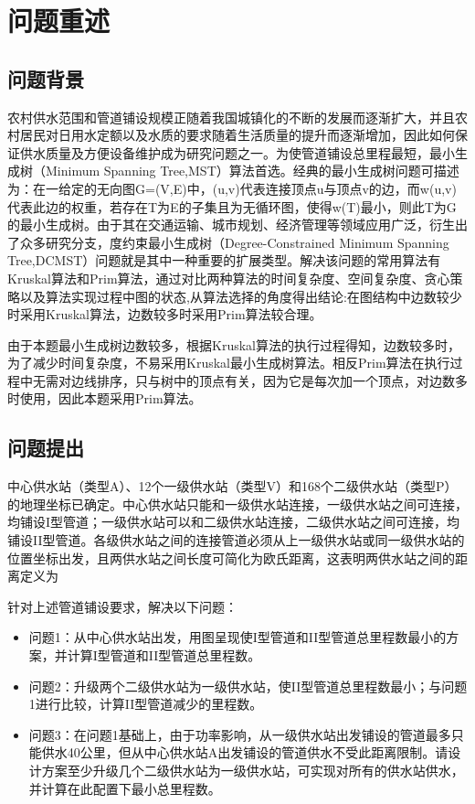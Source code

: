 \documentclass{cumcmthesis}
\begin{document}
\tableofcontents

\newpage
\section{问题重述}
\subsection{问题背景}
农村供水范围和管道铺设规模正随着我国城镇化的不断的发展而逐渐扩大，并且农村居民对日用水定额以及水质的要求随着生活质量的提升而逐渐增加，因此如何保证供水质量及方便设备维护成为研究问题之一。为使管道铺设总里程最短，最小生成树（Minimum Spanning Tree,MST）算法首选。经典的最小生成树问题可描述为：在一给定的无向图G=(V,E)中，(u,v)代表连接顶点u与顶点v的边，而w(u,v)代表此边的权重，若存在T为E的子集且为无循环图，使得w(T)最小，则此T为G的最小生成树。由于其在交通运输、城市规划、经济管理等领域应用广泛，衍生出了众多研究分支，度约束最小生成树（Degree-Constrained Minimum Spanning Tree,DCMST）问题就是其中一种重要的扩展类型。解决该问题的常用算法有Kruskal算法和Prim算法，通过对比两种算法的时间复杂度、空间复杂度、贪心策略以及算法实现过程中图的状态,从算法选择的角度得出结论:在图结构中边数较少时采用Kruskal算法，边数较多时采用Prim算法较合理。

由于本题最小生成树边数较多，根据Kruskal算法的执行过程得知，边数较多时，为了减少时间复杂度，不易采用Kruskal最小生成树算法。相反Prim算法在执行过程中无需对边线排序，只与树中的顶点有关，因为它是每次加一个顶点，对边数多时使用，因此本题采用Prim算法。


\subsection{问题提出}
中心供水站（类型A）、12个一级供水站（类型V）和168个二级供水站（类型P）的地理坐标已确定。中心供水站只能和一级供水站连接，一级供水站之间可连接，均铺设I型管道；一级供水站可以和二级供水站连接，二级供水站之间可连接，均铺设II型管道。各级供水站之间的连接管道必须从上一级供水站或同一级供水站的位置坐标出发，且两供水站之间长度可简化为欧氏距离，这表明两供水站之间的距离定义为

针对上述管道铺设要求，解决以下问题：
\begin{itemize}
    \item 问题1：从中心供水站出发，用图呈现使I型管道和II型管道总里程数最小的方案，并计算I型管道和II型管道总里程数。
    \item 问题2：升级两个二级供水站为一级供水站，使II型管道总里程数最小；与问题1进行比较，计算II型管道减少的里程数。
    \item 问题3：在问题1基础上，由于功率影响，从一级供水站出发铺设的管道最多只能供水40公里，但从中心供水站A出发铺设的管道供水不受此距离限制。请设计方案至少升级几个二级供水站为一级供水站，可实现对所有的供水站供水，并计算在此配置下最小总里程数。
\end{itemize}
\end{document}
